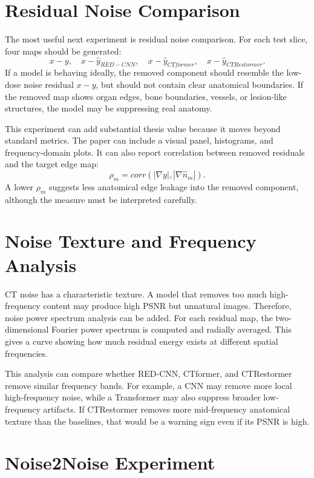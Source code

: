 \documentclass[12pt,a4paper]{report}
\begin{document}
\section{Residual Noise Comparison}

The most useful next experiment is residual noise comparison. For each test slice, four maps should be generated:
\[
x-y,\quad x-\hat{y}_{RED-CNN},\quad x-\hat{y}_{CTformer},\quad x-\hat{y}_{CTRestormer}.
\]
If a model is behaving ideally, the removed component should resemble the low-dose noise residual \(x-y\), but should not contain clear anatomical boundaries. If the removed map shows organ edges, bone boundaries, vessels, or lesion-like structures, the model may be suppressing real anatomy.

This experiment can add substantial thesis value because it moves beyond standard metrics. The paper can include a visual panel, histograms, and frequency-domain plots. It can also report correlation between removed residuals and the target edge map:
\begin{equation}
\rho_m = corr(|\nabla y|, |\nabla \hat{n}_m|).
\end{equation}
A lower \(\rho_m\) suggests less anatomical edge leakage into the removed component, although the measure must be interpreted carefully.

\section{Noise Texture and Frequency Analysis}

CT noise has a characteristic texture. A model that removes too much high-frequency content may produce high PSNR but unnatural images. Therefore, noise power spectrum analysis can be added. For each residual map, the two-dimensional Fourier power spectrum is computed and radially averaged. This gives a curve showing how much residual energy exists at different spatial frequencies.

This analysis can compare whether RED-CNN, CTformer, and CTRestormer remove similar frequency bands. For example, a CNN may remove more local high-frequency noise, while a Transformer may also suppress broader low-frequency artifacts. If CTRestormer removes more mid-frequency anatomical texture than the baselines, that would be a warning sign even if its PSNR is high.

\section{Noise2Noise Experiment}
\end{document}
